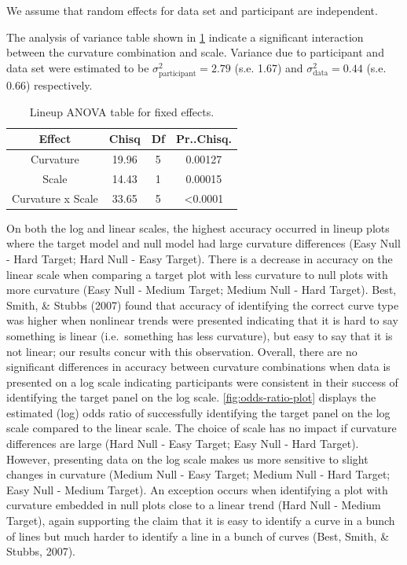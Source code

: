\documentclass[print]{nuthesis}
\begin{document}
\noindent We assume that random effects for data set and participant are independent.

The analysis of variance table shown in \cref{tab:lineup-anova-table} indicate a significant interaction between the curvature combination and scale. Variance due to participant and data set were estimated to be \(\sigma^2_{\text{participant}} = 2.79\) (s.e. 1.67) and \(\sigma^2_{\text{data}} = 0.44\) (s.e. 0.66) respectively.

\begin{table}

\caption{\label{tab:lineup-anova-table}Lineup ANOVA table for fixed effects.}
\centering
\begin{tabular}[t]{cccc}
\toprule
Effect & Chisq & Df & Pr..Chisq.\\
\midrule
Curvature & 19.96 & 5 & 0.00127\\
Scale & 14.43 & 1 & 0.00015\\
Curvature x Scale & 33.65 & 5 & <0.0001\\
\bottomrule
\end{tabular}
\end{table}

On both the log and linear scales, the highest accuracy occurred in lineup plots where the target model and null model had large curvature differences (Easy Null - Hard Target; Hard Null - Easy Target).
There is a decrease in accuracy on the linear scale when comparing a target plot with less curvature to null plots with more curvature (Easy Null - Medium Target; Medium Null - Hard Target).
Best, Smith, \& Stubbs (2007) found that accuracy of identifying the correct curve type was higher when nonlinear trends were presented indicating that it is hard to say something is linear (i.e.~something has less curvature), but easy to say that it is not linear; our results concur with this observation.
Overall, there are no significant differences in accuracy between curvature combinations when data is presented on a log scale indicating participants were consistent in their success of identifying the target panel on the log scale.
\cref{fig:odds-ratio-plot} displays the estimated (log) odds ratio of successfully identifying the target panel on the log scale compared to the linear scale.
The choice of scale has no impact if curvature differences are large (Hard Null - Easy Target; Easy Null - Hard Target).
However, presenting data on the log scale makes us more sensitive to slight changes in curvature (Medium Null - Easy Target; Medium Null - Hard Target; Easy Null - Medium Target).
An exception occurs when identifying a plot with curvature embedded in null plots close to a linear trend (Hard Null - Medium Target), again supporting the claim that it is easy to identify a curve in a bunch of lines but much harder to identify a line in a bunch of curves (Best, Smith, \& Stubbs, 2007).
\end{document}
